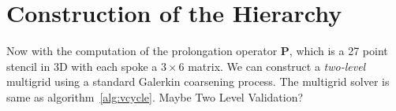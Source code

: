 \section{Construction of the Hierarchy}
Now with the computation of the prolongation operator $\mathbf{P}$, which is a 27 point stencil in 3D with each spoke a $3 \times 6$ matrix. We can construct a \textit{two-level} multigrid using a standard Galerkin coarsening process. The multigrid solver is same as algorithm~\ref{alg:vcycle}.
{\color{red}Maybe Two Level Validation?} 
